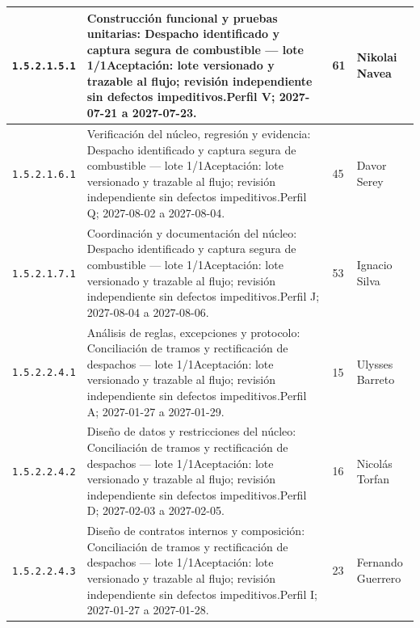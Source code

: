 \begin{longtable}{L{29mm}L{80mm}R{12mm}L{28mm}}
\texttt{1.\allowbreak{}5.\allowbreak{}2.\allowbreak{}1.\allowbreak{}5.\allowbreak{}1} & Construcción funcional y pruebas unitarias: Despacho identificado y captura segura de combustible — lote 1/1\newline Aceptación: lote versionado y trazable al flujo; revisión independiente sin defectos impeditivos.\newline Perfil V; 2027-07-21 a 2027-07-23. & 61 & Nikolai Navea\\\hline
\texttt{1.\allowbreak{}5.\allowbreak{}2.\allowbreak{}1.\allowbreak{}6.\allowbreak{}1} & Verificación del núcleo, regresión y evidencia: Despacho identificado y captura segura de combustible — lote 1/1\newline Aceptación: lote versionado y trazable al flujo; revisión independiente sin defectos impeditivos.\newline Perfil Q; 2027-08-02 a 2027-08-04. & 45 & Davor Serey\\\hline
\texttt{1.\allowbreak{}5.\allowbreak{}2.\allowbreak{}1.\allowbreak{}7.\allowbreak{}1} & Coordinación y documentación del núcleo: Despacho identificado y captura segura de combustible — lote 1/1\newline Aceptación: lote versionado y trazable al flujo; revisión independiente sin defectos impeditivos.\newline Perfil J; 2027-08-04 a 2027-08-06. & 53 & Ignacio Silva\\\hline
\texttt{1.\allowbreak{}5.\allowbreak{}2.\allowbreak{}2.\allowbreak{}4.\allowbreak{}1} & Análisis de reglas, excepciones y protocolo: Conciliación de tramos y rectificación de despachos — lote 1/1\newline Aceptación: lote versionado y trazable al flujo; revisión independiente sin defectos impeditivos.\newline Perfil A; 2027-01-27 a 2027-01-29. & 15 & Ulysses Barreto\\\hline
\texttt{1.\allowbreak{}5.\allowbreak{}2.\allowbreak{}2.\allowbreak{}4.\allowbreak{}2} & Diseño de datos y restricciones del núcleo: Conciliación de tramos y rectificación de despachos — lote 1/1\newline Aceptación: lote versionado y trazable al flujo; revisión independiente sin defectos impeditivos.\newline Perfil D; 2027-02-03 a 2027-02-05. & 16 & Nicolás Torfan\\\hline
\texttt{1.\allowbreak{}5.\allowbreak{}2.\allowbreak{}2.\allowbreak{}4.\allowbreak{}3} & Diseño de contratos internos y composición: Conciliación de tramos y rectificación de despachos — lote 1/1\newline Aceptación: lote versionado y trazable al flujo; revisión independiente sin defectos impeditivos.\newline Perfil I; 2027-01-27 a 2027-01-28. & 23 & Fernando Guerrero\\\hline

\end{longtable}
